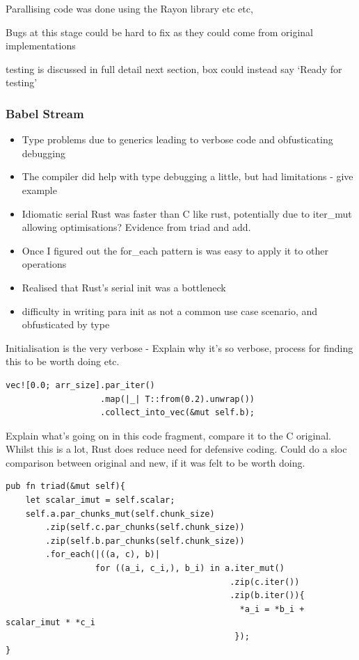 Parallising code was done using the Rayon library etc etc,

Bugs at this stage could be hard to fix as they could come from original implementations

testing is discussed in full detail next section, box could instead say `Ready for testing'

\subsubsection{Babel Stream}
\begin{itemize}
  \item Type problems due to generics leading to verbose code and obfusticating debugging
  \item The compiler did help with type debugging a little, but had limitations - give example
  \item Idiomatic serial Rust was faster than C like rust, potentially due to iter\_mut allowing optimisations? Evidence from triad and add.
  \item Once I figured out the for\_each pattern is was easy to apply it to other operations
  \item Realised that Rust's serial init was a bottleneck
  \item difficulty in writing para init as not a common use case scenario, and obfusticated by type
\end{itemize}

Initialisation is the very verbose - Explain why it's so verbose, process for finding this to be worth doing etc.
\begin{lstlisting}
vec![0.0; arr_size].par_iter()
                   .map(|_| T::from(0.2).unwrap())
                   .collect_into_vec(&mut self.b);
\end{lstlisting}

Explain what's going on in this code fragment, compare it to the C original. Whilst this is a lot, Rust does reduce need for defensive coding. Could do a sloc comparison between original and new, if it was felt to be worth doing.

\begin{lstlisting}
pub fn triad(&mut self){
    let scalar_imut = self.scalar;
    self.a.par_chunks_mut(self.chunk_size)
        .zip(self.c.par_chunks(self.chunk_size))
        .zip(self.b.par_chunks(self.chunk_size))
        .for_each(|((a, c), b)|
                  for ((a_i, c_i,), b_i) in a.iter_mut()
                                             .zip(c.iter())
                                             .zip(b.iter()){
                                               *a_i = *b_i + scalar_imut * *c_i
                                              });
}
\end{lstlisting}

